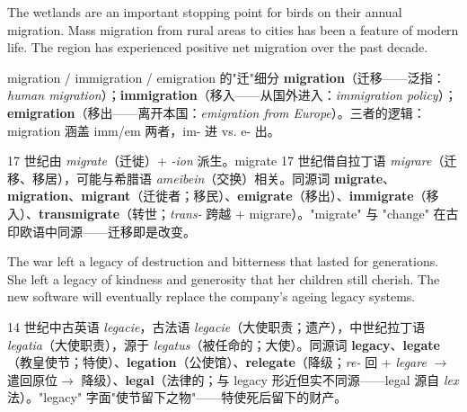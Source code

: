 \documentclass[../main.tex]{subfiles}
\begin{document}

{The wetlands are an important stopping point for birds on their annual migration.}
{Mass migration from rural areas to cities has been a feature of modern life.}
{The region has experienced positive net migration over the past decade.}

\begin{gram}{migration / immigration / emigration 的"迁"细分}
\textbf{migration}（迁移——泛指：\textit{human migration}）；\textbf{immigration}（移入——从国外进入：\textit{immigration policy}）；\textbf{emigration}（移出——离开本国：\textit{emigration from Europe}）。三者的逻辑：migration 涵盖 imm/em 两者，im- 进 vs. e- 出。
\end{gram}

\begin{origin}
17 世纪由 \textit{migrate}（迁徙）+ \textit{-ion} 派生。migrate 17 世纪借自拉丁语 \textit{migrare}（迁移、移居），可能与希腊语 \textit{ameibein}（交换）相关。同源词 \textbf{migrate}、\textbf{migration}、\textbf{migrant}（迁徙者；移民）、\textbf{emigrate}（移出）、\textbf{immigrate}（移入）、\textbf{transmigrate}（转世；\textit{trans-} 跨越 + migrare）。"migrate" 与 "change" 在古印欧语中同源——迁移即是改变。
\end{origin}


{The war left a legacy of destruction and bitterness that lasted for generations.}
{She left a legacy of kindness and generosity that her children still cherish.}
{The new software will eventually replace the company's ageing legacy systems.}

\begin{origin}
14 世纪中古英语 \textit{legacie}，古法语 \textit{legacie}（大使职责；遗产），中世纪拉丁语 \textit{legatia}（大使职责），源于 \textit{legatus}（被任命的；大使）。同源词 \textbf{legacy}、\textbf{legate}（教皇使节；特使）、\textbf{legation}（公使馆）、\textbf{relegate}（降级；\textit{re-} 回 + \textit{legare} $\to$ 遣回原位$\to$ 降级）、\textbf{legal}（法律的；与 legacy 形近但实不同源——legal 源自 \textit{lex} 法）。"legacy" 字面"使节留下之物"——特使死后留下的财产。
\end{origin}

\end{document}
